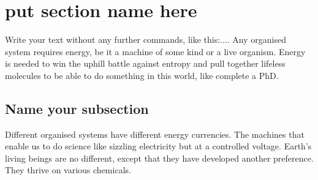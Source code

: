 

\ifpdf
    \graphicspath{{1_introduction/figures/PNG/}{1_introduction/figures/PDF/}{1_introduction/figures/}}
\else
    \graphicspath{{1_introduction/figures/EPS/}{1_introduction/figures/}}
\fi






\section{put section name here} %
Write your text without any further commands, like this:.... Any organised system requires energy, be it a machine of some kind or a live organism. Energy is needed to win the uphill battle against entropy and pull together lifeless molecules to be able to do something in this world, like complete a PhD.



\subsection{Name your subsection} %
Different organised systems have different energy currencies. The machines that enable us to do science like sizzling electricity but at a controlled voltage. Earth's living beings are no different, except that they have developed another preference. They thrive on various chemicals. 

